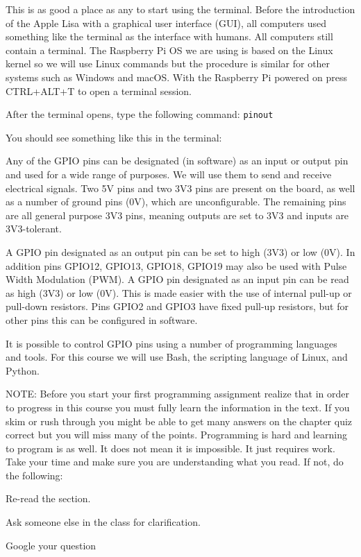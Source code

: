 \documentclass[
]{book}
\begin{document}
This is as good a place as any to start using the terminal. Before the introduction of the Apple Lisa with a graphical user interface (GUI), all computers used something like the terminal as the interface with humans. All computers still contain a terminal. The Raspberry Pi OS we are using is based on the Linux kernel so we will use Linux commands but the procedure is similar for other systems such as Windows and macOS. With the Raspberry Pi powered on press CTRL+ALT+T to open a terminal session.

After the terminal opens, type the following command: \texttt{pinout}

You should see something like this in the terminal:

Any of the GPIO pins can be designated (in software) as an input or output pin and used for a wide range of purposes. We will use them to send and receive electrical signals. Two 5V pins and two 3V3 pins are present on the board, as well as a number of ground pins (0V), which are unconfigurable. The remaining pins are all general purpose 3V3 pins, meaning outputs are set to 3V3 and inputs are 3V3-tolerant.

A GPIO pin designated as an output pin can be set to high (3V3) or low (0V). In addition pins GPIO12, GPIO13, GPIO18, GPIO19 may also be used with Pulse Width Modulation (PWM). A GPIO pin designated as an input pin can be read as high (3V3) or low (0V). This is made easier with the use of internal pull-up or pull-down resistors. Pins GPIO2 and GPIO3 have fixed pull-up resistors, but for other pins this can be configured in software.

It is possible to control GPIO pins using a number of programming languages and tools. For this course we will use Bash, the scripting language of Linux, and Python.

NOTE: Before you start your first programming assignment realize that in order to progress in this course you must fully learn the information in the text. If you skim or rush through you might be able to get many answers on the chapter quiz correct but you will miss many of the points. Programming is hard and learning to program is as well. It does not mean it is impossible. It just requires work. Take your time and make sure you are understanding what you read. If not, do the following:

Re-read the section.

Ask someone else in the class for clarification.

Google your question
\end{document}
